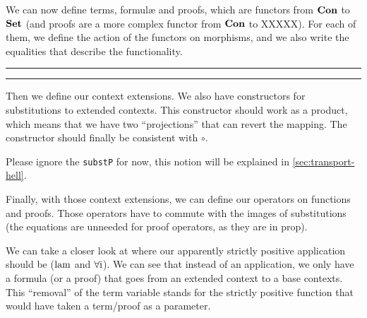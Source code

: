 \documentclass[10pt,a4paper]{article}
\begin{document}
			We can now define terms, formulæ and proofs, which are functors from $\textbf{Con}$ to $\textbf{Set}$ (and proofs are a more complex functor from $\textbf{Con}$ to XXXXX). For each of them, we define the action of the functors on morphisms, and we also write the equalities that describe the functionality.
			
			\def\agdasep{\vspace{-10.5ex}\begin{center}\rule{0.9\linewidth}{0.4pt}\end{center}\vspace{-3.5ex}}
			\begin{tcolorbox}
				\vspace{-2ex}
				\agdasep
				\agdasep
				\vspace{-7.5ex}
			\end{tcolorbox}
		
			Then we define our context extensions. We also have constructors for substitutions to extended contexts. This constructor should work as a product, which means that we have two \enquote{projections} that can revert the mapping. The constructor should finally be consistent with $\circ$.
			
			Please ignore the \verb*|substP| for now, this notion will be explained in \autoref{sec:transport-hell}.
		
			\begin{tcolorbox}
				\vspace{-2ex}
				\agda{agda/Tm+.tex}
				\vspace{-7.5ex}
			\end{tcolorbox}
			\begin{tcolorbox}
				\vspace{-2ex}
				\agda{agda/Pf+.tex}
				\vspace{-7.5ex}
			\end{tcolorbox}
	
			Finally, with those context extensions, we can define our operators on functions and proofs. Those operators have to commute with the images of substitutions (the equations are unneeded for proof operators, as they are in prop).
			
			We can take a closer look at where our apparently strictly positive application should be ($\operatorname{lam}$ and $\operatorname{\operatorname{\forall i}}$). We can see that instead of an application, we only have a formula (or a proof) that goes from an extended context to a base contexts. This \enquote{removal} of the term variable stands for the strictly positive function that would have taken a term/proof as a parameter.
	
\end{document}
